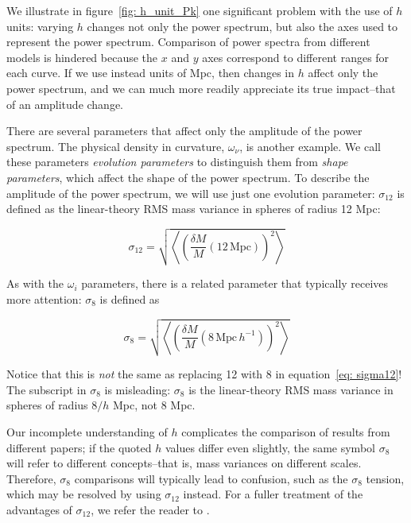 We illustrate in figure~\ref{fig: h_unit_Pk} one significant problem with the
use of $h$ units: varying $h$ changes not only the power 
spectrum, but also the axes used to represent the power spectrum. Comparison 
of power spectra from different 
models is hindered because the $x$ and $y$ axes correspond to different ranges
for each curve. If we use instead units of Mpc, then changes in $h$ affect
only the power spectrum, and we can much more readily appreciate its true
impact--that of an amplitude change.


There are several parameters that affect only the amplitude of the power 
spectrum. The physical density in curvature, $\omega_\nu$, is another example.
We call these parameters \textit{evolution parameters} to distinguish them
from \textit{shape parameters}, which affect the shape of the power
spectrum. To describe the amplitude of the power spectrum, we will use just 
one evolution parameter: $\sigma_{12}$ is defined as the linear-theory RMS 
mass variance in spheres of radius 12 Mpc:

\begin{equation}
\label{eq: sigma12}
\sigma_{12}
=
\sqrt{\left\langle \left(
	\frac{\delta M}{M} (12 \, \mathrm{Mpc})
\right)^2 \right\rangle}
\end{equation}

As with the $\omega_i$ parameters, there is a related parameter that
typically receives more attention: $\sigma_8$ is defined as

\begin{equation}
\sigma_8
=
\sqrt{\left\langle \left(
	\frac{\delta M}{M} (8 \, \mathrm{Mpc} \, h^{-1})
\right)^2 \right\rangle}
\end{equation}

Notice that this is \textit{not} the same as replacing 12 with 8 in
equation~\ref{eq: sigma12}! The subscript in $\sigma_8$ is misleading:
$\sigma_8$ is the linear-theory RMS mass variance in spheres of radius
$8 / h$ Mpc, not 8 Mpc. 

Our incomplete understanding of $h$ complicates the comparison of results
from different papers; if the quoted $h$ values differ even slightly, the same
symbol $\sigma_8$ will refer to different concepts--that is, mass variances on
different scales. Therefore, $\sigma_8$ comparisons will typically lead to
confusion, such as the $\sigma_8$ tension, which may be resolved by using
$\sigma_{12}$ instead.
For a fuller treatment of the advantages of $\sigma_{12}$, we
refer the reader to \citet{San20}.

